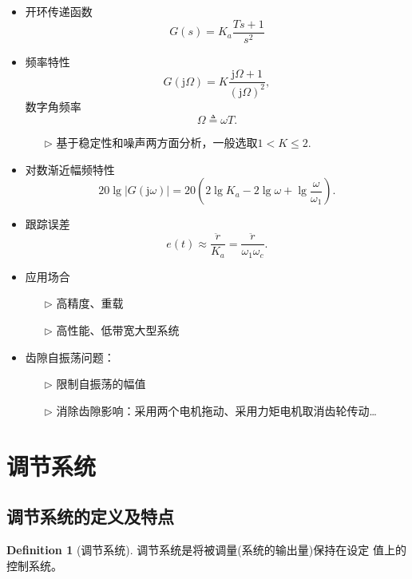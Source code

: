\documentclass[14pt,a4paper]{article}
\theoremstyle{plain}
\theoremstyle{definition}
\newtheorem*{dfn}{Definition}
\theoremstyle{remark}
\theoremstyle{plain}
\theoremstyle{plain}
\theoremstyle{definition}
\begin{document}
			\begin{itemize}
				\item 开环传递函数
					\[
						G(s) = K_{a} \dfrac{Ts+1}{s^2}
					\]
				\item 频率特性
					\[
						G(\mathrm{j} \Omega ) = K \dfrac{\mathrm{j} \Omega + 1}{\left( \mathrm{j} \Omega  \right)^2}
					,\]
					数字角频率
					\[
					\Omega \triangleq \omega T
					.\] 
					\begin{itemize}
						\item[$\triangleright$] 基于稳定性和噪声两方面分析，一般选取$1<K \le 2$. 
					\end{itemize}  
				\item 对数渐近幅频特性
					\[
						20\lg \left| G(\mathrm{j} \omega ) \right| = 20\left( 2\lg K_a - 2\lg \omega + \lg \dfrac{\omega}{\omega_1} \right) 
					.\]
				\item 跟踪误差
					\[
						e(t) \approx \dfrac{\ddot r}{K_a} = \dfrac{\ddot r}{\omega_1 \omega_c}  
					.\]
				\item 应用场合
					\begin{itemize}
						\item[$\triangleright$] 高精度、重载
						\item[$\triangleright$] 高性能、低带宽大型系统
					\end{itemize} 
				\item 齿隙自振荡问题：
					\begin{itemize}
						\item[$\triangleright$] 限制自振荡的幅值
						\item[$\triangleright$] 消除齿隙影响：采用两个电机拖动、采用力矩电机取消齿轮传动\ldots
					\end{itemize}  
			\end{itemize} 
			

	\newpage
	\section{调节系统}%
	\label{sec:调节系统}

		\subsection{调节系统的定义及特点}%
		\label{sub:调节系统的定义及特点}
			
		\begin{dfn}[调节系统]  
		\label{dfn:调节系统}
			调节系统是将被调量(系统的输出量)保持在设定
值上的控制系统。
		\end{dfn} 
\end{document}

